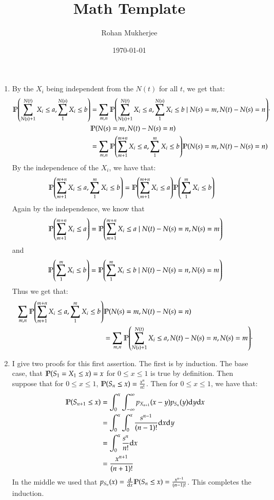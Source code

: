 \documentclass[12pt]{article}
\title{Math Template}
\date{\today}
\author{Rohan Mukherjee}
\theoremstyle{definitionstyle}
\newcommand{\1}{\mathds 1}
\renewcommand{\P}{\mathbb P \qty}
\begin{document}
    \maketitle
    \begin{enumerate}
        \item By the $X_i$ being independent from the $N(t)$ for all $t$, we get that:
        \begin{align*}
            \P(\sum_{N(s)+1}^{N(t)} X_i \leq a, \sum_{1}^{N(s)} X_i \leq b) &= \sum_{m,n} \P(\sum_{N(s)+1}^{N(t)} X_i \leq a, \sum_{1}^{N(s)} X_i \leq b \mid N(s) = m, N(t) - N(s) = n) \cdot \\ 
            &\P(N(s) = m, N(t) - N(s) = n) \\
            &= \sum_{m,n} \P(\sum_{m+1}^{m+n} X_i \leq a, \sum_{1}^{m} X_i \leq b) \P(N(s) = m, N(t) - N(s) = n) \\
        \end{align*}
        By the independence of the $X_i$, we have that:
        \begin{align*}
            \P(\sum_{m+1}^{m+n} X_i \leq a, \sum_{1}^{m} X_i \leq b) &= \P(\sum_{m+1}^{m+n} X_i \leq a) \P(\sum_{1}^{m} X_i \leq b)
        \end{align*}
        Again by the independence, we know that 
        \begin{align*}
            \P(\sum_{m+1}^{m+n} X_i \leq a) = \P(\sum_{m+1}^{m+n} X_i \leq a \mid N(t) - N(s) = n, N(s) = m)
        \end{align*} and 
        \begin{align*}
            \P(\sum_{1}^{m} X_i \leq b) = \P(\sum_{1}^{m} X_i \leq b \mid N(t) - N(s) = n, N(s) = m)
        \end{align*} 
        Thus we get that:
        \begin{align*}
            \sum_{m,n} \P(\sum_{m+1}^{m+n} X_i \leq a, \sum_{1}^{m} X_i \leq b) &\P(N(s) = m, N(t) - N(s) = n) 
            \\&= \sum_{m,n} \P(\sum_{N(s)+1}^{N(t)} X_i \leq a, N(t) - N(s) = n, N(s)=m) \cdot
        \end{align*}

        \item I give two proofs for this first assertion. The first is by induction. The base case, that $\P(S_1 = X_1 \leq x) = x$ for $0 \leq x \leq 1$ is true by definition. Then suppose that for $0 \leq x \leq 1$, $\P(S_n \leq x) = \frac{x^n}{n!}$. Then for $0 \leq x \leq 1$, we have that:
        \begin{align*}
            \P(S_{n+1} \leq x) &= \int_0^x \int_{-\infty}^\infty p_{X_{n+1}}(x-y) p_{S_n}(y) \dd y \dd x \\
            &= \int_0^x \int_0^x \frac{s^{n-1}}{(n-1)!} \dd x \dd y \\
            &= \int_0^x \frac{s^n}{n!} \dd x \\
            &= \frac{x^{n+1}}{(n+1)!}
        \end{align*}
        In the middle we used that $p_{S_n}(x) = \dv{x} \P(S_n \leq x) = \frac{x^{n-1}}{(n-1)!}$. This completes the induction. 


\end{enumerate}
\end{document}
